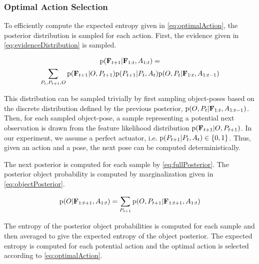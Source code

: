             \subsubsection{Optimal Action Selection}

                To efficiently compute the expected entropy given in \eqref{eq:optimalAction}, the posterior distribution is sampled for each action.                First, the evidence given in \eqref{eq:evidenceDistribution} is sampled.

                {\small
                \begin{multline}
                    \label{eq:evidenceDistribution}
                    \prob{\set{F}_{t+1}|\set{F}_{1:t}, A_{1:t}} = \\ \sum_{P_t,P_{t+1},O}  \prob{\set{F}_{t+1}|O,P_{t+1}} \prob{P_{t+1}|P_t,A_t} \prob{O,P_t|\set{F}_{1:t},A_{1:t-1}}
                \end{multline}
                }

%

                This distribution can be sampled trivially by first sampling object-poses based on the discrete distribution defined by the previous posterior, $\text{p}(O,P_t|\mathbf{F}_{1:t},A_{1:t-1})$. Then, for each sampled object-pose, a sample representing a potential next observation is drawn from the feature likelihood distribution $\text{p}(\mathbf{F}_{t+1}|O,P_{t+1})$. In our experiment, we assume a perfect actuator, i.e. $\text{p}(P_{t+1}|P_t,A_t) \in \{ 0 , 1 \}$. Thus, given an action and a pose, the next pose can be computed deterministically.

                The next posterior is computed for each sample by \eqref{eq:fullPosterior}. The posterior object probability is computed by marginalization given in \eqref{eq:objectPosterior}.

                \begin{equation}
                    \label{eq:objectPosterior}
                    \prob{O|\set{F}_{1:t+1},A_{1:t}} = \sum_{P_{t+1}} \prob{O,P_{t+1}|\set{F}_{1:t+1},A_{1:t}}
                \end{equation}

                The entropy of the posterior object probabilities is computed for each sample and then averaged to give the expected entropy of the object posterior. The expected entropy is computed for each potential action and the optimal action is selected according to \eqref{eq:optimalAction}.
